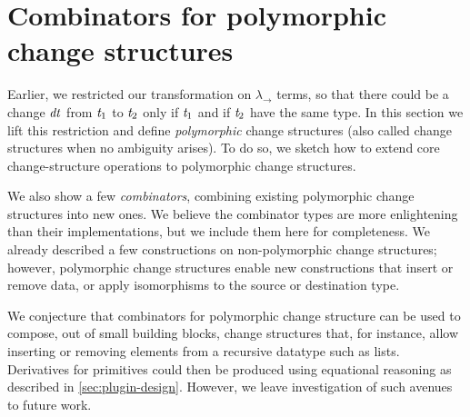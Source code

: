 
\section{Combinators for polymorphic change structures}
\label{sec:param-derive-changes-across-types}





Earlier, we restricted our transformation on \ensuremath{\lambda_{\to}} terms, so that there could be a change
\ensuremath{\Varid{dt}} from \ensuremath{\Varid{t}_{1}} to \ensuremath{\Varid{t}_{2}} only if \ensuremath{\Varid{t}_{1}} and if \ensuremath{\Varid{t}_{2}} have the same type. In this
section we lift this restriction and define \emph{polymorphic} change
structures (also called change structures when no ambiguity arises). To do so,
we sketch how to extend core change-structure operations to polymorphic change structures.

We also show a few \emph{combinators}, combining existing polymorphic change
structures into new ones. We believe the combinator types are more enlightening
than their implementations, but we include them here for completeness.
We already described a few constructions on non-polymorphic change structures;
however, polymorphic change structures enable new constructions that insert or
remove data, or apply isomorphisms to the source or destination type.

We conjecture that combinators for polymorphic change structure can be used to
compose, out of small building blocks, change structures that, for instance,
allow inserting or removing elements from a recursive datatype such as lists.
Derivatives for primitives could then be produced using equational reasoning as
described in \cref{sec:plugin-design}.
However, we leave investigation of such avenues to future work.

